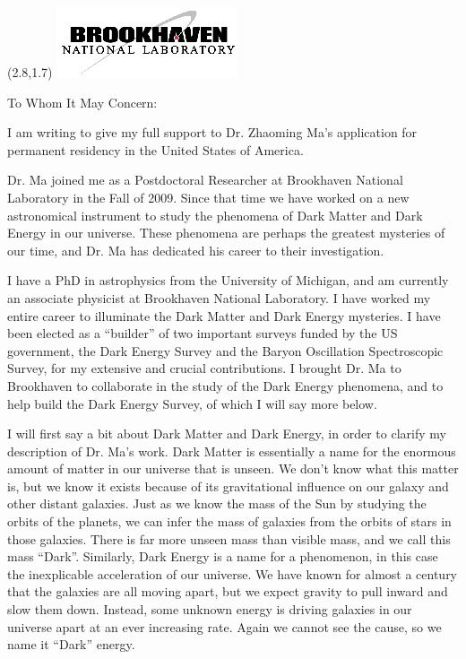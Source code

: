 \documentclass[12pt]{letter}
\begin{document}
\begin{textblock}{2}(2.8,1.7)
\includegraphics[scale=2.0]{bnl-logo}
\end{textblock}

\begin{letter}{}

\opening{To Whom It May Concern:}

I am writing to give my full support to Dr. Zhaoming Ma's application for
permanent residency in the United States of America.

Dr. Ma joined me as a Postdoctoral Researcher at Brookhaven National Laboratory
in the Fall of 2009.  Since that time we have worked on a new astronomical
instrument to study the phenomena of Dark Matter and Dark Energy in our
universe.  These phenomena are perhaps the greatest mysteries of our time, and
Dr. Ma has dedicated his career to their investigation.

I have a PhD in astrophysics from the University of Michigan, and am currently
an associate physicist at Brookhaven National Laboratory.  I have worked my
entire career to illuminate the Dark Matter and Dark Energy mysteries.  I have
been elected as a ``builder'' of two important surveys funded by the US
government, the Dark Energy Survey and the Baryon Oscillation Spectroscopic
Survey, for my extensive and crucial contributions.  I brought Dr. Ma to
Brookhaven to collaborate in the study of the Dark Energy phenomena, and to
help build the Dark Energy Survey, of which I will say more below.

I will first say a bit about Dark Matter and Dark Energy, in order to clarify
my description of Dr. Ma's work.  Dark Matter is essentially a name for the
enormous amount of matter in our universe that is unseen.  We don't know what
this matter is, but we know it exists because of its gravitational influence on
our galaxy and other distant galaxies.  Just as we know the mass of the Sun by
studying the orbits of the planets, we can infer the mass of galaxies from the
orbits of stars in those galaxies.  There is far more unseen mass than visible
mass, and we call this mass ``Dark''.  Similarly, Dark Energy is a name for a
phenomenon, in this case the inexplicable acceleration of our universe. We have
known for almost a century that the galaxies are all moving apart, but we
expect gravity to pull inward and slow them down.  Instead, some unknown energy
is driving galaxies in our universe apart at an ever increasing rate.  Again
we cannot see the cause, so we name it ``Dark'' energy.


\end{letter}
\end{document}
